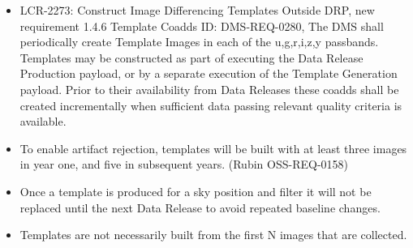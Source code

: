 \begin{itemize} 
\item LCR-2273: Construct Image Differencing Templates Outside DRP, new requirement 1.4.6 Template Coadds ID: DMS-REQ-0280, The DMS shall periodically create Template Images in each of the u,g,r,i,z,y passbands. Templates may be constructed as part of executing the Data Release Production payload, or by a separate execution of the Template Generation payload. Prior to their availability from Data Releases these coadds shall be created incrementally when sufficient data passing relevant quality criteria is available. 
\item To enable artifact rejection, templates will be built with at least three images in year one, and five in subsequent years.  (Rubin OSS-REQ-0158)
\item Once a template is produced for a sky position and filter it will not be replaced until the next Data Release to avoid repeated baseline changes.
\item Templates are not necessarily built from the first N images that are collected.
\end{itemize}


